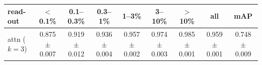 \begin{tabular}{lcccccccc}
\toprule
read-out & $<$0.1\% & 0.1--0.3\% & 0.3--1\% & 1--3\% & 3--10\% & $>$10\% & all & mAP \\
\midrule
attn ($k=3$) & 0.875 $\pm$ 0.007 & 0.919 $\pm$ 0.012 & 0.936 $\pm$ 0.004 & 0.957 $\pm$ 0.002 & 0.974 $\pm$ 0.003 & 0.985 $\pm$ 0.001 & 0.959 $\pm$ 0.001 & 0.748 $\pm$ 0.009 \\
\bottomrule
\end{tabular}
